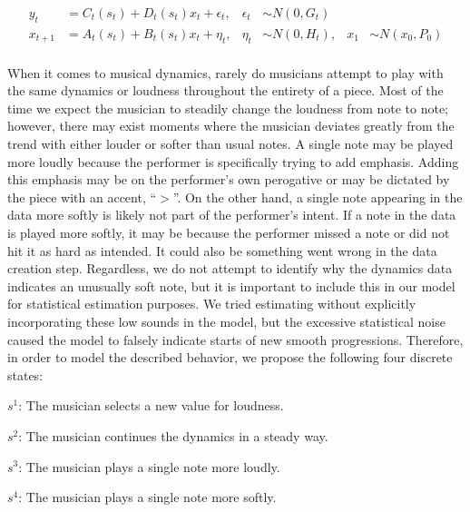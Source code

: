 \documentclass[12pt]{article}
\begin{document}
\begin{equation}
  \begin{aligned}
    y_t &= C_t(s_t) + D_t(s_t)x_t + \epsilon_t, 
    & \epsilon_t & \sim N(0,G_t)\\
    x_{t+1} &= A_t(s_t) + B_t(s_t)x_t + \eta_t, 
    & \eta_t & \sim N(0,H_t), 
    & x_1 & \sim N(x_0,P_0) \\
  \end{aligned}
  \label{eq:switchstatemodel}
\end{equation}

When it comes to musical dynamics, rarely do musicians attempt to play
with the same dynamics or loudness throughout the entirety of a piece.
Most of the time we expect the musician to steadily change the loudness
from note to note; however, there may exist moments where the musician
deviates greatly from the trend with either louder or softer than usual
notes. A single note may be played more loudly because the performer is
specifically trying to add emphasis. Adding this emphasis may be on the
performer's own perogative or may be dictated by the piece with an
accent, ``\textbf{$>$}''. On the other hand, a single note appearing in
the data more softly is likely not part of the performer's intent. If a
note in the data is played more softly, it may be because the performer
missed a note or did not hit it as hard as intended. It could also be
something went wrong in the data creation step. Regardless, we do not
attempt to identify why the dynamics data indicates an unusually soft
note, but it is important to include this in our model for statistical
estimation purposes. We tried estimating without explicitly
incorporating these low sounds in the model, but the excessive
statistical noise caused the model to falsely indicate starts of new
smooth progressions. Therefore, in order to model the described
behavior, we propose the following four discrete states:

\begin{list}{}{}

\item[$s^1$:] The musician selects a new value for loudness.

\item[$s^2$:] The musician continues the dynamics in a steady way.

\item[$s^3$:] The musician plays a single note more loudly.

\item[$s^4$:] The musician plays a single note more softly.

\end{list}
\end{document}
